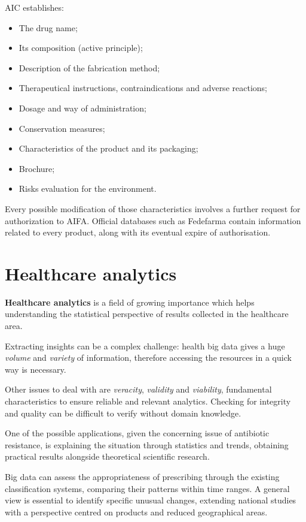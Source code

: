 AIC establishes:
\begin{itemize}
	\item The drug name;
	\item Its composition (active principle);
	\item Description of the fabrication method;
	\item Therapeutical instructions, contraindications and adverse reactions;
	\item Dosage and way of administration;
	 \item Conservation measures;
	 \item Characteristics of the product and its packaging;
	 \item Brochure;
	 \item Risks evaluation for the environment.
\end{itemize}

Every possible modification of those characteristics involves a further request for authorization to AIFA. Official databases such as Fedefarma contain information related to every product, along with its eventual expire of authorisation.

\section{Healthcare analytics}
\textbf{Healthcare analytics} is a field of growing importance which helps understanding the statistical perspective of results collected in the healthcare area. 

Extracting insights can be a complex challenge: health big data gives a huge \textit{volume} and \textit{variety} of information, therefore accessing the resources in a quick way is necessary. 

Other issues to deal with are \textit{veracity}, \textit{validity} and \textit{viability}, fundamental characteristics to ensure reliable and relevant analytics. Checking for integrity and quality can be difficult to verify without domain knowledge\cite{4vs}.

One of the possible applications, given the concerning issue of antibiotic resistance, is explaining the situation through statistics and trends, obtaining practical results alongside theoretical scientific research. 

Big data can assess the appropriateness of prescribing through the existing classification systems, comparing their patterns within time ranges. A general view is essential to identify specific unusual changes, extending national studies with a perspective centred on products and reduced geographical areas.

